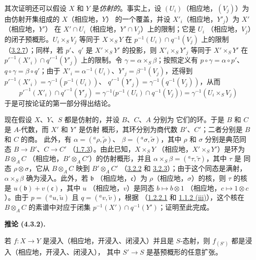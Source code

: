\documentclass[UTF8,fontset=none,11pt,oneside,openany]{ctexbook}
\newenvironment{corollary}[1][]{%
  \par\medskip\noindent\textbf{推论 (#1).}\ %
}{\par}
\let\EGAOriginalLabel\label
\renewcommand{\label}[1]{\phantomsection\EGAOriginalLabel{#1}}
\begin{document}
其次证明还可以假设 $X$ 和 $Y$ 是\emph{仿射的}。事实上，设
$(U_i)$（相应地，$(V_j)$）为由仿射开集组成的 $X$（相应地，$Y$）
的一个覆盖，并设 $X'_i$（相应地，$Y'_j$）为 $X'$（相应地，$Y'$）
在 $X'\cap U_i$（相应地，$Y'\cap V_j$）上的限制；它是 $U_i$
（相应地，$V_j$）的闭子预概形。$U_i\times_S V_j$ 等同于
$X\times_S Y$ 在 $p^{-1}(U_i)\cap q^{-1}(V_j)$ 上的限制
（\hyperref[I.3.2.7-fr]{3.2.7}）；同样，若 $p'$、$q'$ 是
$X'\times_S Y'$ 的投影，则 $X'_i\times_S Y'_j$ 等同于
$X'\times_S Y'$ 在
${p'}^{-1}(X'_i)\cap{q'}^{-1}(Y'_j)$ 上的限制。令
$\gamma=\alpha\times_S\beta$；按照定义有
$p\circ\gamma=\alpha\circ p'$、$q\circ\gamma=\beta\circ q'$；由于
$X'_i=\alpha^{-1}(U_i)$、$Y'_j=\beta^{-1}(V_j)$，还得到
${p'}^{-1}(X'_i)=\gamma^{-1}(p^{-1}(U_i))$、
${q'}^{-1}(Y'_j)=\gamma^{-1}(q^{-1}(V_j))$，从而
\[
  {p'}^{-1}(X'_i)\cap{q'}^{-1}(Y'_j)
  =\gamma^{-1}\bigl(p^{-1}(U_i)\cap q^{-1}(V_j)\bigr)
  =\gamma^{-1}(U_i\times_S V_j)
\]
于是可按论证的第一部分得出结论。

现在假设 $X$、$Y$、$S$ 都是仿射的，并设 $B$、$C$、$A$ 分别为
它们的环。于是 $B$ 和 $C$ 是 $A$-代数，而 $X'$ 和 $Y'$ 是仿射
概形，其环分别为商代数 $B'$、$C'$；二者分别是 $B$ 和 $C$ 的商。
此外，有
$\alpha=({}^a\rho,\widetilde{\rho})$、
$\beta=({}^a\sigma,\widetilde{\sigma})$，其中 $\rho$ 和 $\sigma$
分别是典范同态 $B\to B'$、$C\to C'$
（\hyperref[I.1.7.3-fr]{1.7.3}）。由此已知，$X\times_S Y$
（相应地，$X'\times_S Y'$）是环为 $B\otimes_A C$
（相应地，$B'\otimes_A C'$）的仿射概形，并且
$\alpha\times_S\beta=({}^a\tau,\widetilde{\tau})$，其中 $\tau$ 是
同态 $\rho\otimes\sigma$，它从 $B\otimes_A C$ 映到
$B'\otimes_A C'$
（\hyperref[I.3.2.2-fr]{3.2.2} 和
\hyperref[I.3.2.3-fr]{3.2.3}）；由于这个同态是满射，
$\alpha\times_S\beta$ 确为浸入。此外，若 $\mathfrak{b}$
（相应地，$\mathfrak{c}$）为 $\rho$（相应地，$\sigma$）的核，则
$\tau$ 的核是 $u(\mathfrak{b})+v(\mathfrak{c})$，其中 $u$
（相应地，$v$）是同态 $b\mapsto b\otimes1$
（相应地，$c\mapsto1\otimes c$）。由于
$p=({}^a u,\widetilde{u})$ 且 $q=({}^a v,\widetilde{v})$，根据
（\hyperref[I.1.2.2.1-fr]{1.2.2.1} 和
\hyperref[I.1.1.2-fr]{1.1.2 (iii)}），这个核在
$B\otimes_A C$ 的素谱中对应于闭集
$p^{-1}(X')\cap q^{-1}(Y')$；证明至此完成。

\begin{corollary}[4.3.2]
\label{I.4.3.2-fr}
若 $f:X\to Y$ 是浸入（相应地，开浸入、闭浸入）并且是
$S$-态射，则 $f_{(S')}$ 都是浸入（相应地，开浸入、闭浸入），
其中 $S'\to S$ 是基预概形的任意扩张。
\end{corollary}
\end{document}
